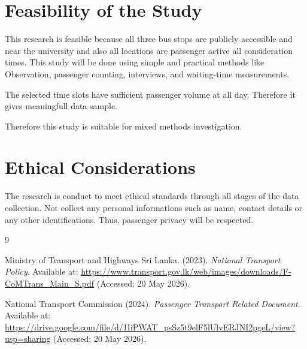 \documentclass[12pt,a4paper]{report}
\begin{document}
\section{Feasibility of the Study}

This research is feasible because all three bus stops are publicly accessible and near the university and also all locations are passenger active all consideration times. 
This study will be done using simple and practical methods like Observation, passenger counting, interviews, and waiting-time measurements. 

The selected time slots have sufficient passenger volume at all day. Therefore it gives meaningfull data sample.

Therefore this study is suitable for mixed methods investigation.


\section{Ethical Considerations}

The research is conduct to meet ethical standards through all stages of the data collection. Not collect any personal informations such as name, contact details or any other identifications. Thus, passenger privacy will be respected.



\clearpage
\renewcommand{\bibname}{References}

\begin{thebibliography}{9}

Ministry of Transport and Highways Sri Lanka. (2023). 
\textit{National Transport Policy}. Available at: 
\url{https://www.transport.gov.lk/web/images/downloads/F-CoMTrans_Main_S.pdf}
(Accessed: 20 May 2026).

National Transport Commission (2024). 
\textit{Passenger Transport Related Document}. Available at: 
\url{https://drive.google.com/file/d/1IiPWAT_psSz5t9elF5lUlvERJNI2pgeL/view?usp=sharing}
(Accessed: 20 May 2026).

\end{thebibliography}



\end{document}
